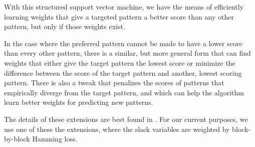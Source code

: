 With this structured support vector machine, we have the means of
efficiently learning weights that give a targeted pattern a better
score than any other pattern, but only if those weights exist. 

In the case where the preferred pattern cannot be made to have a lower
score than every other pattern, there is a similar, but more general
form that can find weights that either give the target pattern the
lowest score or minimize the difference between the score of the
target pattern and another, lowest scoring pattern. There is also a
tweak that penalizes the scores of patterns that empirically diverge
from the target pattern, and which can help the algorithm learn better
weights for predicting new patterns.

The details of these extensions are best found in
\cite{nowozin_structured_2010, szummer_learning_2008}. For our
current purposes, we use one of these the extensions, where the slack
variables are weighted by block-by-block Hamming loss.
